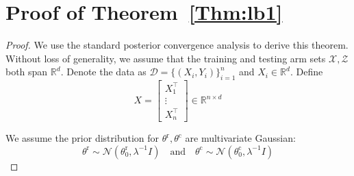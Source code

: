 \documentclass[accepted]{uai2025} %
\theoremstyle{plain}
\theoremstyle{definition}
\theoremstyle{remark}
\newcommand{\thetac}{\theta^{\mathrm{c}}}
\newcommand{\thetar}{\theta^{\mathrm{r}}}
\begin{document}
\section{Proof of Theorem~\ref{Thm:lb1}}
\begin{proof}
    We use the standard posterior convergence analysis to derive this theorem. Without loss of generality, we assume that the training and testing arm sets $\mathcal{X}, \mathcal{Z}$ both span $\mathbb{R}^d$. 
Denote the data as $\mathcal{D} = \{(X_i, Y_i)\}_{i=1}^n$ and $X_i \in \mathbb{R}^d$. Define 
$$
X =\begin{bmatrix}
X_1^\top \\ \vdots\\ X_n^\top 
\end{bmatrix} \in\mathbb{R}^{n\times d}
$$

We assume the prior distribution for $\thetar, \thetac$ are multivariate Gaussian:
\[
\thetar \sim \mathcal{N}(\thetar_0, {\lambda}^{-1} I) \quad\mbox{and}\quad
\thetac \sim \mathcal{N}(\thetac_0, {\lambda}^{-1} I)
\]



\end{proof}
\end{document}
